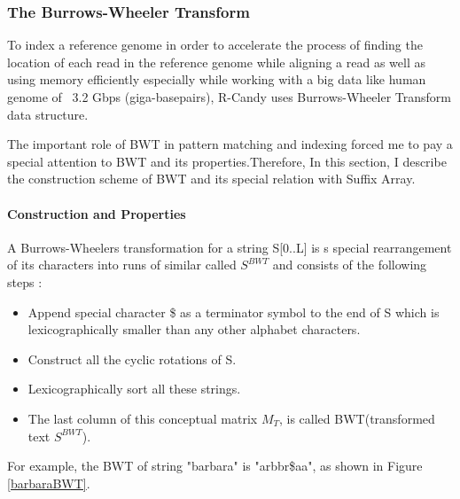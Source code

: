 \documentclass[11pt,a4paper]{report}
\begin{document}
\subsubsection{The Burrows-Wheeler Transform}

To index a reference genome in order to accelerate the process of finding the location of each read in the reference genome while aligning a read as well as using memory efficiently especially while working with a big data like human genome of ~3.2 Gbps (giga-basepairs), R-Candy uses Burrows-Wheeler Transform data structure.

The important role of BWT in pattern matching and indexing forced me to pay a special attention to BWT and its properties.Therefore, In this section, I describe the construction scheme of BWT and its special relation with Suffix Array.\\

\paragraph{Construction and Properties}

A Burrows-Wheelers transformation for a string S[0..L] is s special rearrangement of its characters into runs of similar called $S^{BWT}$ and consists of the following steps \cite{bwt}:

\begin{itemize} 
	\item Append special character \$ as a terminator symbol to the end of S which is lexicographically smaller than any other alphabet characters.
	\item  Construct all the cyclic rotations of S.
	\item  Lexicographically sort all these strings.
	\item The last column of this conceptual matrix \emph{$M_{T}$}, is called BWT(transformed text $S^{BWT}$).
\end{itemize}


For example, the BWT of string "barbara" is "arbbr\$aa", as shown in Figure \ref{barbaraBWT}.\\
\end{document}
